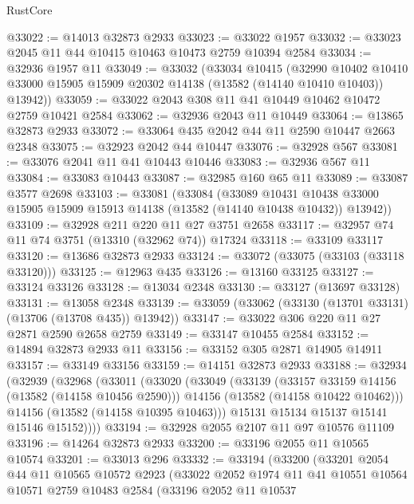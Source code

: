 \begin{lexlean}{RustCore}
\begin{coremodule}
@33022 := @14013 @32873 @2933
@33023 := @33022 @1957
@33032 := @33023 @2045 @11 @44 @10415 @10463 @10473 @2759 @10394 @2584
@33034 := @32936 @1957 @11
@33049 := @33032
    (@33034
      @10415
      (@32990
        @10402
        @10410
        @33000
        @15905
        @15909
        @20302
        @14138
        (@13582 (@14140 @10410 @10403))
        @13942))
@33059 := @33022 @2043 @308 @11 @41 @10449 @10462 @10472 @2759 @10421 @2584
@33062 := @32936 @2043 @11 @10449
@33064 := @13865 @32873 @2933
@33072 := @33064 @435 @2042 @44 @11 @2590 @10447 @2663 @2348
@33075 := @32923 @2042 @44 @10447
@33076 := @32928 @567
@33081 := @33076 @2041 @11 @41 @10443 @10446
@33083 := @32936 @567 @11
@33084 := @33083 @10443
@33087 := @32985 @160 @65 @11
@33089 := @33087 @3577 @2698
@33103 := @33081
    (@33084
      (@33089
        @10431
        @10438
        @33000
        @15905
        @15909
        @15913
        @14138
        (@13582 (@14140 @10438 @10432))
        @13942))
@33109 := @32928 @211 @220 @11 @27 @3751 @2658
@33117 := @32957 @74 @11 @74 @3751 (@13310 (@32962 @74)) @17324
@33118 := @33109 @33117
@33120 := @13686 @32873 @2933
@33124 := @33072 (@33075 (@33103 (@33118 @33120)))
@33125 := @12963 @435
@33126 := @13160 @33125
@33127 := @33124 @33126
@33128 := @13034 @2348
@33130 := @33127 (@13697 @33128)
@33131 := @13058 @2348
@33139 := @33059 (@33062 (@33130 (@13701 @33131) (@13706 (@13708 @435)) @13942))
@33147 := @33022 @306 @220 @11 @27 @2871 @2590 @2658 @2759
@33149 := @33147 @10455 @2584
@33152 := @14894 @32873 @2933 @11
@33156 := @33152 @305 @2871 @14905 @14911
@33157 := @33149 @33156
@33159 := @14151 @32873 @2933
@33188 := @32934
    (@32939
      (@32968
        (@33011
          (@33020
            (@33049
              (@33139
                (@33157 @33159 @14156 (@13582 (@14158 @10456 @2590)))
                @14156
                (@13582 (@14158 @10422 @10462)))
              @14156
              (@13582 (@14158 @10395 @10463)))
            @15131
            @15134
            @15137
            @15141
            @15146
            @15152))))
@33194 := @32928 @2055 @2107 @11 @97 @10576 @11109
@33196 := @14264 @32873 @2933
@33200 := @33196 @2055 @11 @10565 @10574
@33201 := @33013 @296
@33332 := @33194
    (@33200
      (@33201
        @2054
        @44
        @11
        @10565
        @10572
        @2923
        (@33022
          @2052
          @1974
          @11
          @41
          @10551
          @10564
          @10571
          @2759
          @10483
          @2584
          (@33196
            @2052
            @11
            @10537

\end{coremodule}
\end{lexlean}
